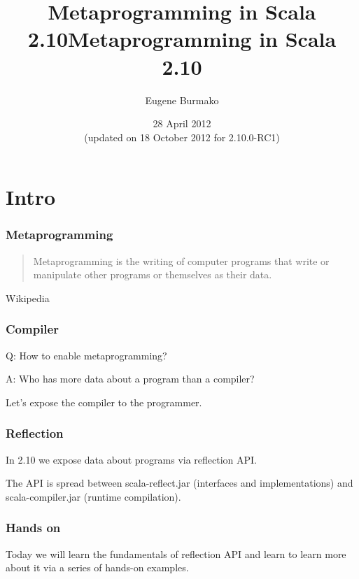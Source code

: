 \documentclass[hyperref={bookmarks=false}]{beamer}
\title{Metaprogramming in Scala 2.10}
\begin{document}
\title{Metaprogramming in Scala 2.10}
\author{Eugene Burmako}
\date{28 April 2012 \\ (updated on 18 October 2012 for 2.10.0-RC1)}
\maketitle

\section{Intro}

\begin{frame}[fragile]
\frametitle{Metaprogramming}

\begin{quote}
Metaprogramming is the writing of computer programs that write or manipulate other programs or themselves as their data.
\end{quote}

\begin{flushright}
\textemdash Wikipedia
\end{flushright}

\end{frame}

\begin{frame}[fragile]
\frametitle{Compiler}

Q: How to enable metaprogramming?

A: Who has more data about a program than a compiler?

Let's expose the compiler to the programmer.

\end{frame}

\begin{frame}[fragile]
\frametitle{Reflection}

In 2.10 we expose data about programs via reflection API.

The API is spread between scala-reflect.jar (interfaces and implementations) and scala-compiler.jar (runtime compilation).

\end{frame}

\begin{frame}[fragile]
\frametitle{Hands on}

Today we will learn the fundamentals of reflection API and learn to learn more about it
via a series of hands-on examples.

\end{frame}
\end{document}
